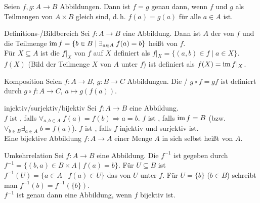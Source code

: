 \begin{Bem}
    Seien $f, g: A \rightarrow B$ Abbildungen.
    Dann ist $f = g$ genau dann, wenn $f$ und $g$ als Teilmengen von
    $A \times B$ gleich sind, d.\,h. $f(a) = g(a)$ für alle $a \in A$ ist.
\end{Bem}

\begin{Def}{Definitions-/Bildbereich}
    Sei $f: A \rightarrow B$ eine Abbildung.
    Dann ist $A$ der  von $f$
    und die Teilmenge $\operatorname{im} f = \{b \in B \;|\; \exists_{a \in A}\; f(a) = b\}$
    heißt  von $f$. \\
    Für $X \subseteq A$ ist die  $f|_X$ von $f$ auf $X$
    definiert als $f|_X = \{(a, b) \in f \;|\; a \in X\}$. \\
    $f(X)$ (Bild der Teilmenge $X$ von $A$ unter $f$) ist definiert als
    $f(X) = \operatorname{im} f|_X$.
\end{Def}

\begin{Def}{Komposition}
    Seien $f: A \rightarrow B$, $g: B \rightarrow C$ Abbildungen.
    Die /
     $g \circ f = gf$ ist definiert durch
    $g \circ f: A \rightarrow C$, $a \mapsto g(f(a))$.
\end{Def}

\begin{Def}{injektiv/surjektiv/bijektiv}
    Sei $f: A \rightarrow B$ eine Abbildung. \\
    $f$ ist , falls
    $\forall_{a, b \in A}\; f(a) = f(b) \Rightarrow a = b$. \qquad
    $f$ ist , falls $\operatorname{im} f = B$
    (bzw. $\forall_{b \in B} \exists_{a \in A}\; b = f(a)$). \qquad
    $f$ ist , falls $f$ injektiv und surjektiv ist. \\
    Eine bijektive Abbildung $f: A \rightarrow A$ einer Menge $A$ in sich
    selbst heißt  von $A$.
\end{Def}

\begin{Def}{Umkehrrelation}
    Sei $f: A \rightarrow B$ eine Abbildung.
    Die  $f^{-1}$ ist gegeben durch
    $f^{-1} = \{(b, a) \in B \times A \;|\; f(a) = b\}$.
    Für $U \subseteq B$ ist $f^{-1}(U) = \{a \in A \;|\; f(a) \in U\}$
    das  von $U$ unter $f$.
    Für $U = \{b\}$ ($b \in B$) schreibt man $f^{-1}(b) = f^{-1}(\{b\})$. \\
    $f^{-1}$ ist genau dann eine Abbildung, wenn $f$ bijektiv ist.
\end{Def}

